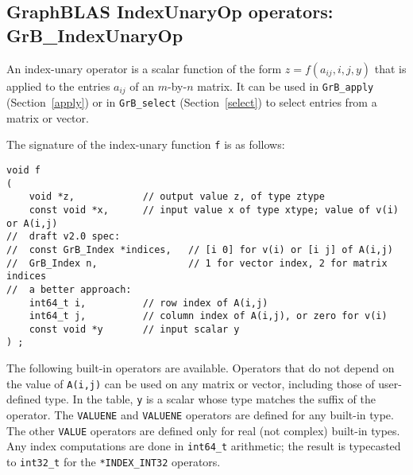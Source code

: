 \documentclass[12pt]{article}
\begin{document}
\newpage
\subsection{GraphBLAS IndexUnaryOp operators: {\sf GrB\_IndexUnaryOp}} %
\label{idxunop}

An index-unary operator is a scalar function of the form
$z=f(a_{ij},i,j,y)$ that is applied to the entries $a_{ij}$ of an
$m$-by-$n$ matrix.  It can be used in \verb'GrB_apply' (Section~\ref{apply}) or
in \verb'GrB_select' (Section~\ref{select}) to select entries from a matrix or
vector.

The signature of the index-unary function \verb'f' is as follows:

{\footnotesize
\begin{verbatim}
void f
(
    void *z,            // output value z, of type ztype
    const void *x,      // input value x of type xtype; value of v(i) or A(i,j)
//  draft v2.0 spec:
//  const GrB_Index *indices,   // [i 0] for v(i) or [i j] of A(i,j)
//  GrB_Index n,                // 1 for vector index, 2 for matrix indices
//  a better approach:
    int64_t i,          // row index of A(i,j)
    int64_t j,          // column index of A(i,j), or zero for v(i)
    const void *y       // input scalar y
) ; \end{verbatim}}

The following built-in operators are available.  Operators that do not depend
on the value of \verb'A(i,j)' can be used on any matrix or vector, including
those of user-defined type.  In the table, \verb'y' is a
scalar whose type matches the suffix of the operator.  The \verb'VALUENE' and
\verb'VALUENE' operators are defined for any built-in type. The other
\verb'VALUE' operators are defined only for real (not complex) built-in types.
Any index computations are done in \verb'int64_t' arithmetic; the result is
typecasted to \verb'int32_t' for the \verb'*INDEX_INT32' operators.
\end{document}
